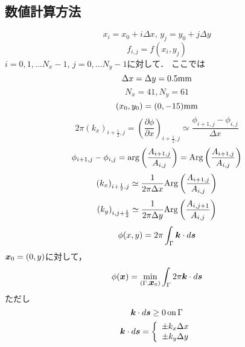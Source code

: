 \subsection{数値計算方法}
\begin{equation}
	x_i=x_0+i \Delta x,\, y_j=y_0+j\Delta y
	\label{eqn:}
\end{equation}
\begin{equation}
	f_{i,j}=f(x_i,y_j)
	\label{eqn:}
\end{equation}
$i=0,1,\dots N_x-1$, $j=0,\dots N_y-1$に対して．
ここでは
\begin{equation}
	\Delta x=\Delta y=0.5{\rm mm}
	\label{eqn:}
\end{equation}
\begin{equation}
	N_x=41, N_y=61
\end{equation}
\begin{equation}
	(x_0,y_0)=(0,-15){\rm mm}
	\label{eqn:}
\end{equation}
\begin{equation}
	2\pi (k_x)_{i+\frac{1}{2},j}
	=
	\left( \frac{\partial \phi }{\partial x}\right) _{i+\frac{1}{2},j}
	\simeq 
	\frac{\phi_{i+1,j}-\phi_{i,j}}{\Delta x}
	\label{eqn:}
\end{equation}
\begin{equation}
	\phi_{i+1,j}-\phi_{i,j}
	=
	\arg \left(\frac{ A_{i+1,j}}{A_{i,j}}\right)
	=
	{\rm Arg} \left(\frac{ A_{i+1,j}}{A_{i,j}} \right)
	\label{eqn:}
\end{equation}
\begin{equation}
	\left( k_x \right)_{i+\frac{1}{2},j} 
	\simeq 
	\frac{1}{2\pi \Delta x}
	{\rm Arg} \left( \frac{ A_{i+1,j}}{A_{i,j}} \right)
	\label{eqn:}
\end{equation}
\begin{equation}
	\left( k_y \right)_{i,j+\frac{1}{2}} 
	\simeq 
	\frac{1}{2\pi \Delta y}
	{\rm Arg} \left( \frac{ A_{i,j+1}}{A_{i,j}} \right)
	\label{eqn:}
\end{equation}
\begin{equation}
	\phi(x,y)=2\pi \int_{\Gamma} \fat{k}\cdot d\fat{s}
	\label{eqn:}
\end{equation}
$\mbox{\boldmath{$x$}}_0=(0,y)$に対して，
\begin{equation}
	\phi(\fat{x})
	=\min_{\left(\Gamma, \fat{x}_0\right)}
	\int_\Gamma 2\pi \fat{k} \cdot d\fat{s}
	\label{eqn:}
\end{equation}
ただし
\begin{equation}
	\fat{k}\cdot d\fat{s}\geq 0 \, {\rm on} \, \Gamma 
	\label{eqn:}
\end{equation}
\begin{equation}
	\fat{k}\cdot d\fat{s}
	=
	\left\{
	\begin{array}{c}
		\pm k_x \Delta x \\
		\pm k_y \Delta y
	\end{array}
	\right.
	\label{eqn:}
\end{equation}

